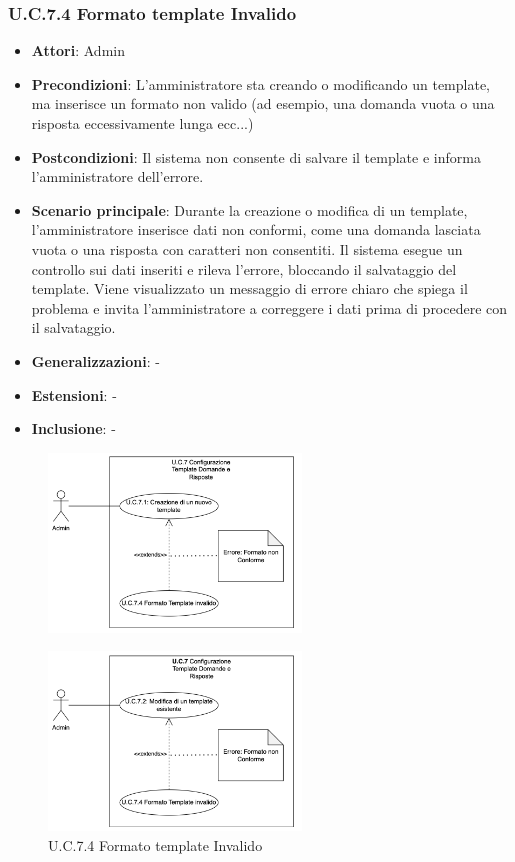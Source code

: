 \subsubsection{U.C.7.4 Formato template Invalido}
\begin{itemize}
    \item \textbf{Attori}: Admin
    \item \textbf{Precondizioni}: L'amministratore sta creando o modificando un template, ma inserisce un formato non valido (ad esempio, una domanda vuota o una risposta eccessivamente lunga ecc...)
    \item \textbf{Postcondizioni}: Il sistema non consente di salvare il template e informa l'amministratore dell'errore.
    \item \textbf{Scenario principale}: Durante la creazione o modifica di un template, l'amministratore inserisce dati non conformi, come una domanda lasciata vuota o una risposta con caratteri non consentiti. Il sistema esegue un controllo sui dati inseriti e rileva l'errore, bloccando il salvataggio del template. Viene visualizzato un messaggio di errore chiaro che spiega il problema e invita l'amministratore a correggere i dati prima di procedere con il salvataggio.
    \item \textbf{Generalizzazioni}: -
    \item \textbf{Estensioni}: -
    \item \textbf{Inclusione}: -
\end{itemize}
\begin{figure}[H]
    \centering
    \includegraphics[width=0.6\textwidth]{img/U.C.7.4.1.png}
\end{figure}
\begin{figure}[H]
    \centering
    \includegraphics[width=0.6\textwidth]{img/U.C.7.4.2.png}
    \caption{U.C.7.4 Formato template Invalido}
\end{figure}
\newpage


